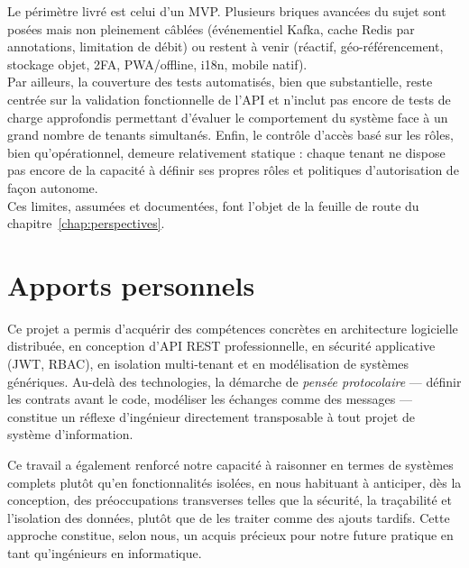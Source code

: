 Le périmètre livré est celui d'un MVP. Plusieurs briques avancées du sujet sont posées mais
non pleinement câblées (événementiel Kafka, cache Redis par annotations, limitation de
débit) ou restent à venir (réactif, géo-référencement, stockage objet, 2FA, PWA/offline,
i18n, mobile natif).\\
Par ailleurs, la couverture des tests automatisés, bien que substantielle, reste centrée sur la validation fonctionnelle de l'API et n'inclut pas encore de tests de charge approfondis permettant d'évaluer le comportement du système face à un grand nombre de tenants simultanés. Enfin, le contrôle d'accès basé sur les rôles, bien qu'opérationnel, demeure relativement statique : chaque tenant ne dispose pas encore de la capacité à définir ses propres rôles et politiques d'autorisation de façon autonome.\\
Ces limites, assumées et documentées, font l'objet de la feuille de route du chapitre~\ref{chap:perspectives}.\\
\section{Apports personnels}

Ce projet a permis d'acquérir des compétences concrètes en architecture logicielle
distribuée, en conception d'API REST professionnelle, en sécurité applicative (JWT, RBAC),
en isolation multi-tenant et en modélisation de systèmes génériques. Au-delà des
technologies, la démarche de \emph{pensée protocolaire} --- définir les contrats avant le
code, modéliser les échanges comme des messages --- constitue un réflexe d'ingénieur
directement transposable à tout projet de système d'information.

Ce travail a également renforcé notre capacité à raisonner en termes de systèmes complets plutôt qu'en fonctionnalités isolées, en nous habituant à anticiper, dès la conception, des préoccupations transverses telles que la sécurité, la traçabilité et l'isolation des données, plutôt que de les traiter comme des ajouts tardifs. Cette approche constitue, selon nous, un acquis précieux pour notre future pratique en tant qu'ingénieurs en informatique.